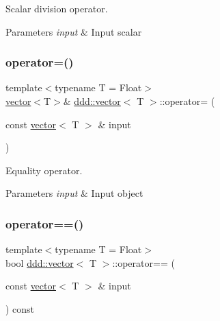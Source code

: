 Scalar division operator. 


\begin{DoxyParams}{Parameters}
{\em input} & Input scalar \\
\hline
\end{DoxyParams}
\mbox{\label{classddd_1_1vector_a0aa127ccd971b78897b99b76f779f87c}} 
\subsubsection{\texorpdfstring{operator=()}{operator=()}}
{\footnotesize\ttfamily template$<$typename T = Float$>$ \\
\hyperlink{classddd_1_1vector}{vector}$<$T$>$\& \hyperlink{classddd_1_1vector}{ddd\+::vector}$<$ T $>$\+::operator= (\begin{DoxyParamCaption}\item[{const \hyperlink{classddd_1_1vector}{vector}$<$ T $>$ \&}]{input }\end{DoxyParamCaption})\hspace{0.3cm}{\ttfamily [inline]}}



Equality operator. 


\begin{DoxyParams}{Parameters}
{\em input} & Input object \\
\hline
\end{DoxyParams}
\mbox{\label{classddd_1_1vector_a7595b24534ba95d03d9ace253a7c355f}} 
\subsubsection{\texorpdfstring{operator==()}{operator==()}}
{\footnotesize\ttfamily template$<$typename T = Float$>$ \\
bool \hyperlink{classddd_1_1vector}{ddd\+::vector}$<$ T $>$\+::operator== (\begin{DoxyParamCaption}\item[{const \hyperlink{classddd_1_1vector}{vector}$<$ T $>$ \&}]{input }\end{DoxyParamCaption}) const\hspace{0.3cm}{\ttfamily [inline]}}




